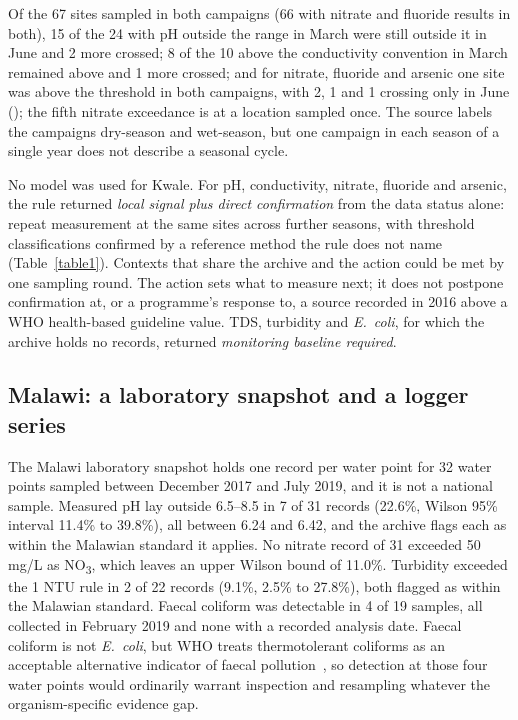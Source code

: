 \documentclass[10pt,letterpaper]{article}
\begin{document}
Of the 67 sites sampled in both campaigns (66 with nitrate and fluoride results in both), 15 of the 24 with pH outside the range in March were still outside it in June and 2 more crossed; 8 of the 10 above the conductivity convention in March remained above and 1 more crossed; and for nitrate, fluoride and arsenic one site was above the threshold in both campaigns, with 2, 1 and 1 crossing only in June (); the fifth nitrate exceedance is at a location sampled once. The source labels the campaigns dry-season and wet-season, but one campaign in each season of a single year does not describe a seasonal cycle.

No model was used for Kwale. For pH, conductivity, nitrate, fluoride and arsenic, the rule returned \textit{local signal plus direct confirmation} from the data status alone: repeat measurement at the same sites across further seasons, with threshold classifications confirmed by a reference method the rule does not name (Table~\ref{table1}). Contexts that share the archive and the action could be met by one sampling round. The action sets what to measure next; it does not postpone confirmation at, or a programme's response to, a source recorded in 2016 above a WHO health-based guideline value. TDS, turbidity and \textit{E.~coli}, for which the archive holds no records, returned \textit{monitoring baseline required}.

\subsection*{Malawi: a laboratory snapshot and a logger series}

The Malawi laboratory snapshot holds one record per water point for 32 water points sampled between December 2017 and July 2019, and it is not a national sample. Measured pH lay outside 6.5--8.5 in 7 of 31 records (22.6\%, Wilson 95\% interval 11.4\% to 39.8\%), all between 6.24 and 6.42, and the archive flags each as within the Malawian standard it applies. No nitrate record of 31 exceeded 50 mg/L as NO\textsubscript{3}, which leaves an upper Wilson bound of 11.0\%. Turbidity exceeded the 1 NTU rule in 2 of 22 records (9.1\%, 2.5\% to 27.8\%), both flagged as within the Malawian standard. Faecal coliform was detectable in 4 of 19 samples, all collected in February 2019 and none with a recorded analysis date. Faecal coliform is not \textit{E.~coli}, but WHO treats thermotolerant coliforms as an acceptable alternative indicator of faecal pollution~\cite{WHO2022GDWQ}, so detection at those four water points would ordinarily warrant inspection and resampling whatever the organism-specific evidence gap.
\end{document}
